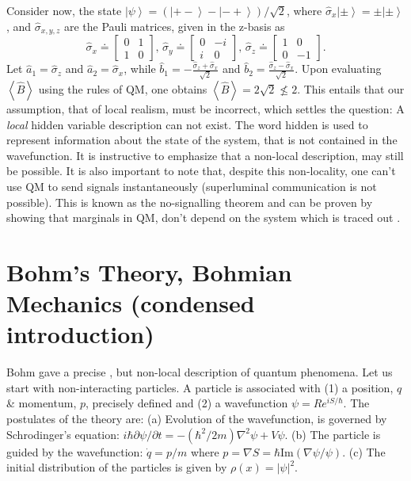 Consider now, the state $\left|\psi\right\rangle =\left(\left|+-\right\rangle -\left|-+\right\rangle \right)/\sqrt{2}$,
where $\hat{\sigma}_{x}\left|\pm\right\rangle =\pm\left|\pm\right\rangle $,
and $\hat{\sigma}_{x,y,z}$ are the Pauli matrices, given in the z-basis
as 
\[
\hat{\sigma}_{x}\doteq\left[\begin{array}{cc}
0 & 1\\
1 & 0
\end{array}\right],\,\hat{\sigma}_{y}\doteq\left[\begin{array}{cc}
0 & -i\\
i & 0
\end{array}\right],\,\hat{\sigma}_{z}\doteq\left[\begin{array}{cc}
1 & 0\\
0 & -1
\end{array}\right].
\]
Let $\hat{a}_{1}=\hat{\sigma}_{z}$ and $\hat{a}_{2}=\hat{\sigma}_{x}$,
while $\hat{b}_{1}=-\frac{\hat{\sigma}_{z}+\hat{\sigma}_{x}}{\sqrt{2}}$
and $\hat{b}_{2}=\frac{\hat{\sigma}_{z}-\hat{\sigma}_{x}}{\sqrt{2}}$.
Upon evaluating $\left\langle \hat{B}\right\rangle $ using the rules
of QM, one obtains $\left\langle \hat{B}\right\rangle =2\sqrt{2}\nleq2$.
This entails that our assumption, that of local realism, must be incorrect,
which settles the question: A \emph{local} hidden variable description
can not exist. The word hidden is used to represent information about
the state of the system, that is not contained in the wavefunction.
It is instructive to emphasize that a non-local description, may still
be possible. It is also important to note that, despite this non-locality,
one can't use QM to send signals instantaneously (superluminal communication
is not possible). This is known as the no-signalling theorem and can
be proven by showing that marginals in QM, don't depend on the system
which is traced out \cite{NielsenChuang}.


\section{Bohm's Theory, Bohmian Mechanics (condensed introduction)\label{sec:Bohm's-Theory,-Bohmian}}

Bohm gave a precise \cite{Bohm1}, but non-local description of quantum
phenomena. Let us start with non-interacting particles. A particle
is associated with (1) a position, $q$ \& momentum, $p$, precisely
defined and (2) a wavefunction $\psi=Re^{iS/\hbar}$. The postulates
of the theory are: (a) Evolution of the wavefunction, is governed
by Schrodinger's equation: $i\hbar\partial\psi/\partial t=-(\hbar^{2}/2m)\nabla^{2}\psi+V\psi$.
(b) The particle is guided by the wavefunction: $\dot{q}=p/m$ where
$p=\nabla S=\hbar\text{Im}(\nabla\psi/\psi)$. (c) The initial distribution
of the particles is given by $\rho(x)=\left|\psi\right|^{2}$.

